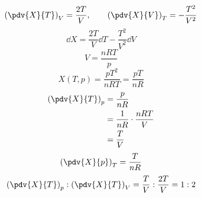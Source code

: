 \[ \left(\pdv{X}{T}\right)_{V}=\frac{2T}{V}, \qquad \left(\pdv{X}{V}\right)_{T}=-\frac{T^{2}}{V^{2}} \]
\[ \dd X=\frac{2T}{V}\dd T-\frac{T^{2}}{V^{2}}\dd V \]
\[ V=\frac{nRT}{p} \]
\[ X(T,p)=\frac{pT^{2}}{nRT}=\frac{pT}{nR} \]
\begin{align*}
\left(\pdv{X}{T}\right)_{p}&=\frac{p}{nR}\\
&=\frac{1}{nR}\cdot\frac{nRT}{V}\\
&=\frac{T}{V}
\end{align*}
\[ \left(\pdv{X}{p}\right)_{T}=\frac{T}{nR} \]
\[ \left(\pdv{X}{T}\right)_{p}:\left(\pdv{X}{T}\right)_{V}=\frac{T}{V}:\frac{2T}{V}=1:2 \]
